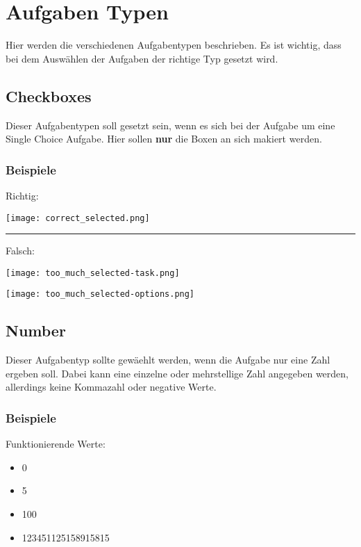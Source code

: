 \author{Tadd\"aus Nauheimer}
\chapter{Aufgaben Typen}

Hier werden die verschiedenen Aufgabentypen beschrieben.
Es ist wichtig, dass bei dem Ausw\"ahlen der Aufgaben der richtige Typ gesetzt wird.


\section{Checkboxes}

Dieser Aufgabentypen soll gesetzt sein, wenn es sich bei der Aufgabe um eine Single Choice Aufgabe.
Hier sollen \textbf{nur} die Boxen an sich makiert werden.

\subsection{Beispiele}

Richtig:

\texttt{[image: correct\_selected.png]}

\par\rule{\textwidth}{0.5pt}

Falsch:

\texttt{[image: too\_much\_selected-task.png]}

\texttt{[image: too\_much\_selected-options.png]}

\section{Number}

Dieser Aufgabentyp sollte gew\"aehlt werden, wenn die Aufgabe nur eine Zahl ergeben soll. 
Dabei kann eine einzelne oder mehrstellige Zahl angegeben werden, allerdings keine Kommazahl oder negative Werte.

\subsection{Beispiele}

Funktionierende Werte:

\begin{itemize}
	\item 0
	\item 5
	\item 100
	\item 123451125158915815
\end{itemize}

